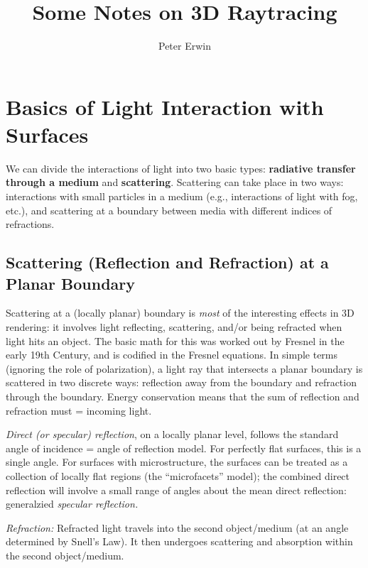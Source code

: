 \documentclass[11pt]{article}
\begin{document}
\title{Some Notes on 3D Raytracing}
\author{Peter Erwin}

\maketitle

\section{Basics of Light Interaction with Surfaces}

We can divide the interactions of light into two basic types:
\textbf{radiative transfer through a medium} and \textbf{scattering}.
Scattering can take place in two ways: interactions with small particles
in a medium (e.g., interactions of light with fog, etc.), and scattering
at a boundary between media with different indices of refractions.


\subsection{Scattering (Reflection and Refraction) at a Planar Boundary}

Scattering at a (locally planar) boundary is \textit{most} of the
interesting effects in 3D rendering: it involves light reflecting,
scattering, and/or being refracted when light hits an object. The basic
math for this was worked out by Fresnel in the early 19th Century, and
is codified in the Fresnel equations. In simple terms (ignoring the role
of polarization), a light ray that intersects a planar boundary is
scattered in two discrete ways: reflection away from the boundary and
refraction through the boundary. Energy conservation means that the
sum of reflection and refraction must = incoming light.

\textit{Direct (or specular) reflection}, on a locally planar level, follows the
standard angle of incidence = angle of reflection model. For perfectly
flat surfaces, this is a single angle. For surfaces with microstructure,
the surfaces can be treated as a collection of locally flat regions (the
``microfacets'' model); the combined direct reflection will involve a
small range of angles about the mean direct reflection: generalzied
\textit{specular reflection.}

\textit{Refraction:} Refracted light travels into the second object/medium (at
an angle determined by Snell's Law). It then undergoes scattering and absorption
within the second object/medium.
\end{document}
